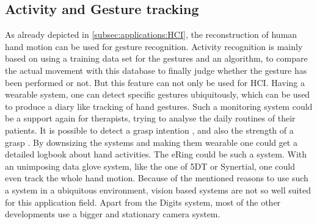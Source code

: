 \subsection{Activity and Gesture tracking} \label{subsec:applications:activity}

As already depicted in \ref{subsec:applications:HCI}, the reconstruction of human hand motion can be used for gesture recognition. Activity recognition is mainly based on using a training data set for the gestures and an algorithm, to compare the actual movement with this database to finally judge whether the gesture has been performed or not. But this feature can not only be used for \ac{HCI}. Having a wearable system, one can detect specific gestures ubiquitously, which can be used to produce a diary like tracking of hand gestures. Such a monitoring system could be a support again for therapists, trying to analyse the daily routines of their patients. It is possible to detect a grasp intention \cite{supuk2008evaluation}, \cite{zhang2011framework} and also the strength of a grasp \cite{ekvall2005grasp}. By downsizing the systems and making them wearable one could get a detailed logbook about hand activities. The eRing \cite{wilhelm2015ering} could be such a system. With an unimposing data glove system, like the one of 5DT or Synertial, one could even track the whole hand motion. Because of the mentioned reasons to use such a system in a ubiquitous environment, vision based systems are not so well suited for this application field. Apart from the Digits \cite{Digits} system, most of the other developments use a bigger and stationary camera system.\\
